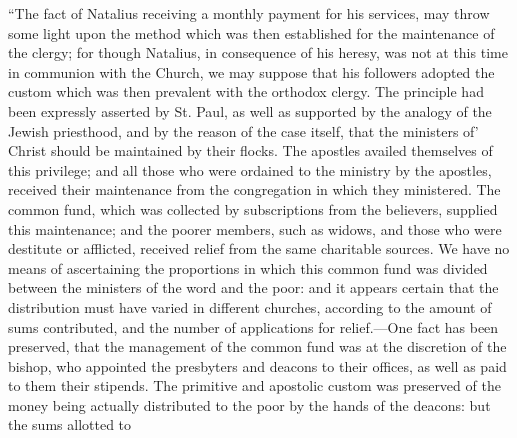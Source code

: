 ``The fact
of Natalius receiving a monthly payment for his services, may throw some
light upon the method which was then established for the maintenance of
the clergy; for though Natalius, in consequence of his heresy, was not
at this time in communion with the Church, we may suppose that his
followers adopted the custom which was then prevalent with the orthodox
clergy. The principle had been expressly asserted by St. Paul, as well
as supported by the analogy of the Jewish priesthood, and by the reason
of the case itself, that the ministers of' Christ should be maintained
by their flocks. The apostles availed themselves of this privilege; and
all those who were ordained to the ministry by the apostles, received
their maintenance from the congregation in which they ministered. The
common fund, which was collected by subscriptions from the believers,
supplied this maintenance; and the poorer members, such as widows, and
those who were destitute or afflicted, received relief from the same
charitable sources. We have no means of ascertaining the proportions in
which this common fund was divided between the ministers of the word and
the poor: and it appears certain that the distribution must have varied
in different churches, according to the amount of sums contributed, and
the number of applications for relief.—One fact has been preserved,
that the management of the common fund was at the discretion of the
bishop, who appointed the presbyters and deacons to their offices, as
well as paid to them their stipends. The primitive and apostolic custom
was preserved of the money being actually distributed to the poor by the
hands of the deacons: but the sums allotted to

